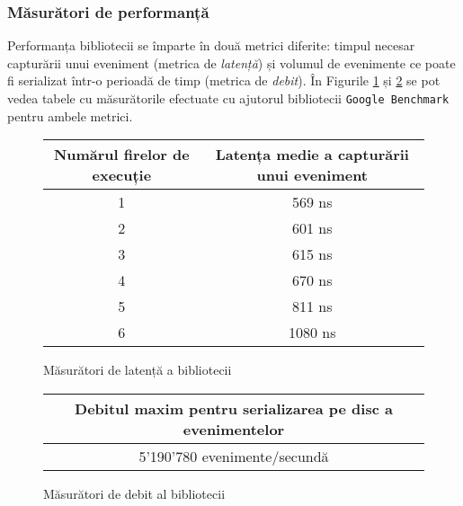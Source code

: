 \subsubsection{Măsurători de performanță}\label{library-performance}

Performanța bibliotecii se împarte în două metrici diferite: timpul
necesar capturării unui eveniment (metrica de \textit{latență}) și
volumul de evenimente ce poate fi serializat într-o perioadă de timp
(metrica de \textit{debit}). În Figurile \ref{fig:lib-perf-latency} și
\ref{fig:lib-perf-throughput} se pot vedea tabele cu măsurătorile
efectuate cu ajutorul bibliotecii
\lstinline{Google Benchmark}\cite{GoogleBenchmark} pentru ambele
metrici.

\begin{figure}[H]
\centering

\begin{center}
    \begin{tabular}{||c c||} 
        \hline
        Numărul firelor de execuție & Latența medie a capturării unui eveniment \\ [0.5ex] 
        \hline\hline
        1 & 569 ns \\ \hline
        2 & 601 ns \\ \hline
        3 & 615 ns \\ \hline
        4 & 670 ns \\ \hline
        5 & 811 ns \\ \hline
        6 & 1080 ns \\ \hline
    \end{tabular}
\end{center}

\caption{Măsurători de latență a bibliotecii}
\label{fig:lib-perf-latency}
\end{figure}

\begin{figure}[H]
\centering

\begin{center}
    \begin{tabular}{||c||} 
        \hline
        Debitul maxim pentru serializarea pe disc a evenimentelor \\ [0.5ex] 
        \hline\hline
        5'190'780 evenimente/secundă \\ \hline
    \end{tabular}
\end{center}

\caption{Măsurători de debit al bibliotecii}
\label{fig:lib-perf-throughput}
\end{figure}

